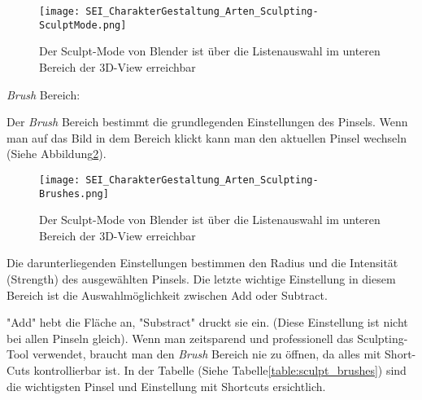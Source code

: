 \begin{figure}[h]
    \centering
    \texttt{[image: SEI\_CharakterGestaltung\_Arten\_Sculpting-SculptMode.png]}
    \caption{Der Sculpt-Mode von Blender ist über die Listenauswahl im unteren Bereich der 3D-View erreichbar}
    \label{picture:sculpt_mode}
\end{figure}

\textit{Brush} Bereich\citep{blender:sculpting_brushes}:

Der \textit{Brush} Bereich bestimmt die grundlegenden Einstellungen des Pinsels.
Wenn man auf das Bild in dem Bereich klickt
kann man den aktuellen Pinsel wechseln (Siehe Abbildung\ref{picture:sculpt_brushes}).
\begin{figure}[h]
    \centering
    \texttt{[image: SEI\_CharakterGestaltung\_Arten\_Sculpting-Brushes.png]}
    \caption{Der Sculpt-Mode von Blender ist über die Listenauswahl im unteren Bereich der 3D-View erreichbar}
    \label{picture:sculpt_brushes}
\end{figure}
Die darunterliegenden Einstellungen bestimmen den Radius
und die Intensität (Strength) des ausgewählten Pinsels. Die
letzte wichtige Einstellung in diesem Bereich ist die
Auswahlmöglichkeit zwischen Add oder Subtract.

"Add" hebt die Fläche an, "Substract" druckt sie ein. (Diese Einstellung ist
nicht bei allen Pinseln gleich). Wenn man zeitsparend und
professionell das Sculpting-Tool verwendet, braucht man den
\textit{Brush} Bereich nie zu öffnen, da alles mit Short-Cuts
kontrollierbar ist. In der Tabelle (Siehe Tabelle\ref{table:sculpt_brushes}) sind die
wichtigsten Pinsel und Einstellung mit Shortcuts ersichtlich.


